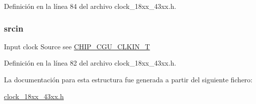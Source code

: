 Definición en la línea 84 del archivo clock\+\_\+18xx\+\_\+43xx.\+h.

\subsubsection[{\texorpdfstring{srcin}{srcin}}]{ srcin}\hypertarget{struct_p_l_l___p_a_r_a_m___t_ae499b9c398971cae537e4efff747fd93}{}\label{struct_p_l_l___p_a_r_a_m___t_ae499b9c398971cae537e4efff747fd93}
Input clock Source see \hyperlink{group___c_l_o_c_k__18_x_x__43_x_x_ga0975326707efebf2b074283e6c602f18}{C\+H\+I\+P\+\_\+\+C\+G\+U\+\_\+\+C\+L\+K\+I\+N\+\_\+T} 

Definición en la línea 82 del archivo clock\+\_\+18xx\+\_\+43xx.\+h.



La documentación para esta estructura fue generada a partir del siguiente fichero\+:\begin{DoxyCompactItemize}
\item 
\hyperlink{clock__18xx__43xx_8h}{clock\+\_\+18xx\+\_\+43xx.\+h}\end{DoxyCompactItemize}
